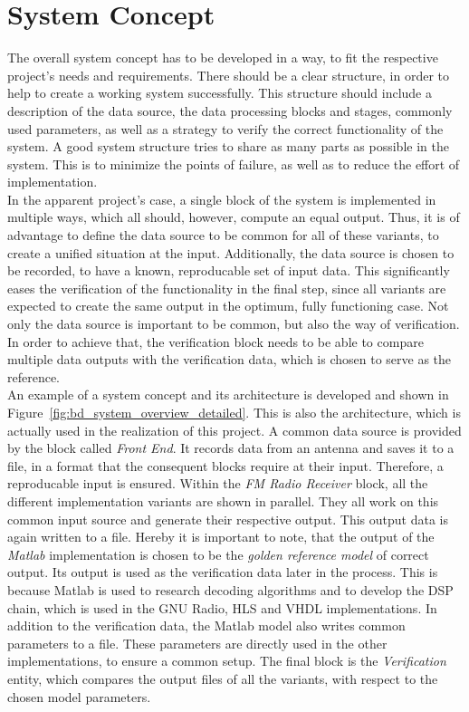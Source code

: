 \section{System Concept}

The overall system concept has to be developed in a way, to fit the respective project's needs and requirements.
There should be a clear structure, in order to help to create a working system successfully.
This structure should include a description of the data source, the data processing blocks and stages, commonly used parameters, as well as a strategy to verify the correct functionality of the system.
A good system structure tries to share as many parts as possible in the system.
This is to minimize the points of failure, as well as to reduce the effort of implementation.\\

In the apparent project's case, a single block of the system is implemented in multiple ways, which all should, however, compute an equal output.
Thus, it is of advantage to define the data source to be common for all of these variants, to create a unified situation at the input.
Additionally, the data source is chosen to be recorded, to have a known, reproducable set of input data.
This significantly eases the verification of the functionality in the final step, since all variants are expected to create the same output in the optimum, fully functioning case.
Not only the data source is important to be common, but also the way of verification.
In order to achieve that, the verification block needs to be able to compare multiple data outputs with the verification data, which is chosen to serve as the reference.\\

An example of a system concept and its architecture is developed and shown in Figure~\ref{fig:bd_system_overview_detailed}.
This is also the architecture, which is actually used in the realization of this project.
A common data source is provided by the block called \textit{Front End}.
It records data from an antenna and saves it to a file, in a format that the consequent blocks require at their input.
Therefore, a reproducable input is ensured.
Within the \textit{FM Radio Receiver} block, all the different implementation variants are shown in parallel.
They all work on this common input source and generate their respective output.
This output data is again written to a file.
Hereby it is important to note, that the output of the \textit{Matlab} implementation is chosen to be the \textit{golden reference model} of correct output.
Its output is used as the verification data later in the process.
This is because Matlab is used to research decoding algorithms and to develop the DSP chain, which is used in the GNU Radio, HLS and VHDL implementations.
In addition to the verification data, the Matlab model also writes common parameters to a file.
These parameters are directly used in the other implementations, to ensure a common setup.
The final block is the \textit{Verification} entity, which compares the output files of all the variants, with respect to the chosen model parameters.\\

